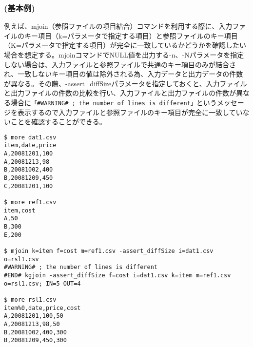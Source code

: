 \subsubsection*{(基本例) }
例えば、mjoin（参照ファイルの項目結合）コマンドを利用する際に、入力ファイルのキー項目（k=パラメータで指定する項目）と参照ファイルのキー項目（K=パラメータで指定する項目）が完全に一致しているかどうかを確認したい場合を想定する。mjoinコマンドでNULL値を出力する-n、-Nパラメータを指定しない場合は、入力ファイルと参照ファイルで共通のキー項目のみが結合され、一致しないキー項目の値は除外される為、入力データと出力データの件数が異なる。その際、-assert\_diffSizeパラメータを指定しておくと、入力ファイルと出力ファイルの件数の比較を行い、入力ファイルと出力ファイルの件数が異なる場合に\verb|「#WARNING# ; the number of lines is different」|というメッセージを表示するので入力ファイルと参照ファイルのキー項目が完全に一致していないことを確認することができる。

\begin{Verbatim}[baselinestretch=0.7,frame=single]
$ more dat1.csv
item,date,price
A,20081201,100
A,20081213,98
B,20081002,400
B,20081209,450
C,20081201,100

$ more ref1.csv
item,cost
A,50
B,300
E,200

$ mjoin k=item f=cost m=ref1.csv -assert_diffSize i=dat1.csv o=rsl1.csv
#WARNING# ; the number of lines is different
#END# kgjoin -assert_diffSize f=cost i=dat1.csv k=item m=ref1.csv o=rsl1.csv; IN=5 OUT=4

$ more rsl1.csv
item%0,date,price,cost
A,20081201,100,50
A,20081213,98,50
B,20081002,400,300
B,20081209,450,300
\end{Verbatim}
